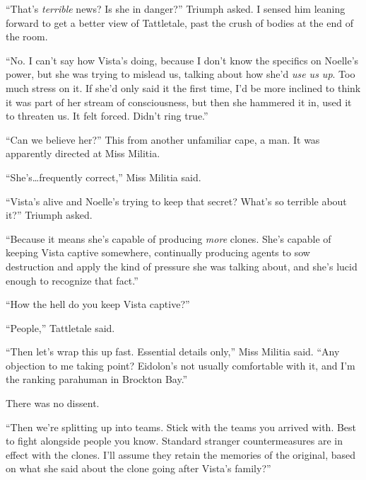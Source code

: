 ``That's \emph{terrible} news?  Is she in danger?''  Triumph asked.  I sensed him leaning forward to get a better view of Tattletale, past the crush of bodies at the end of the room.



``No.  I can't say how Vista's doing, because I don't know the specifics on Noelle's power, but she was trying to mislead us, talking about how she'd \emph{use us up}.  Too much stress on it.  If she'd only said it the first time, I'd be more inclined to think it was part of her stream of consciousness, but then she hammered it in, used it to threaten us.  It felt forced.  Didn't ring true.''



``Can we believe her?''  This from another unfamiliar cape, a man.  It was apparently directed at Miss Militia.



``She's\ldots frequently correct,'' Miss Militia said.



``Vista's alive and Noelle's trying to keep that secret?  What's so terrible about it?''  Triumph asked.



``Because it means she's capable of producing \emph{more} clones.  She's capable of keeping Vista captive somewhere, continually producing agents to sow destruction and apply the kind of pressure she was talking about, and she's lucid enough to recognize that fact.''



``How the hell do you keep Vista captive?''



``People,'' Tattletale said.



``Then let's wrap this up fast.  Essential details only,'' Miss Militia said.  ``Any objection to me taking point?  Eidolon's not usually comfortable with it, and I'm the ranking parahuman in Brockton Bay.''



There was no dissent.



``Then we're splitting up into teams.  Stick with the teams you arrived with.  Best to fight alongside people you know.  Standard stranger countermeasures are in effect with the clones.  I'll assume they retain the memories of the original, based on what she said about the clone going after Vista's family?''



